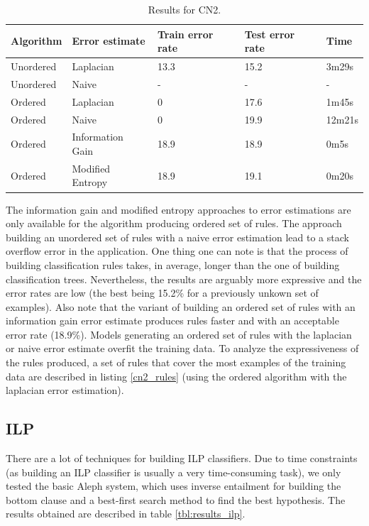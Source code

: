 \documentclass[a4paper]{llncs}
\begin{document}
\begin{table}
\begin{center}
\begin{tabular}{ | l | l | l | l | l |}
    \hline
    \textbf{Algorithm} & \textbf{Error estimate} & \textbf{Train error rate} & \textbf{Test error rate} & \textbf{Time} \\ \hline
    Unordered & Laplacian & 13.3 & 15.2 & 3m29s \\ \hline
    Unordered & Naive & - & - & - \\ \hline
    Ordered & Laplacian & 0 & 17.6 & 1m45s \\ \hline
    Ordered & Naive & 0 & 19.9 & 12m21s \\ \hline
    Ordered & Information Gain & 18.9 & 18.9 & 0m5s \\ \hline
    Ordered & Modified Entropy & 18.9 & 19.1 & 0m20s \\ \hline
\end{tabular}
\caption{Results for CN2.}
\label{tbl:results_cn2}
\end{center}
\end{table}

The information gain and modified entropy approaches to error estimations are
only available for the algorithm producing ordered set of rules. The approach
building an unordered set of rules with a naive error estimation lead to a stack
overflow error in the application. One thing one can note is that the process of
building classification rules takes, in average, longer than the one of building
classification trees. Nevertheless, the results are arguably more expressive and
the error rates are low (the best being 15.2\% for a previously unkown set of 
examples). Also note that the variant of building an ordered set of rules with
an information gain error estimate produces rules faster and with an acceptable
error rate (18.9\%). Models generating an ordered set of rules with the 
laplacian or naive error estimate overfit the training data. To analyze the 
expressiveness of the rules produced, a set of rules that cover the most 
examples of the training data are described in listing \ref{cn2_rules} (using 
the ordered algorithm with the laplacian error estimation).

\subsection{ILP}

There are a lot of techniques for building ILP classifiers. Due to time
constraints (as building an ILP classifier is usually a very time-consuming 
task), we only tested the basic Aleph system, which uses inverse entailment for
building the bottom clause and a best-first search method to find the best
hypothesis. The results obtained are described in table \ref{tbl:results_ilp}.
\end{document}
